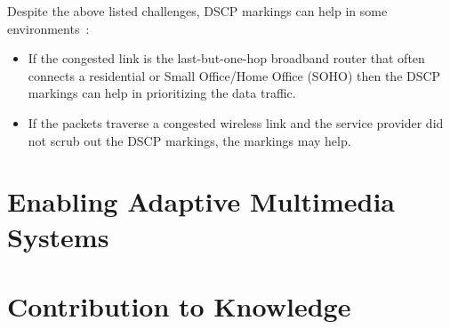 

Despite the above listed challenges, DSCP markings can help in some
environments~\cite{draft.rtcweb.qos}:

\begin{itemize}
	\item If the congested link is the last-but-one-hop broadband router that
	often connects a residential or Small Office/Home Office (SOHO) then the 
	DSCP markings can help in prioritizing the data traffic. 
	\item If the packets traverse a congested wireless link and the service 
	provider did not scrub out the DSCP markings, the markings may help.
\end{itemize}

\section{Enabling Adaptive Multimedia Systems}

\section{Contribution to Knowledge}
